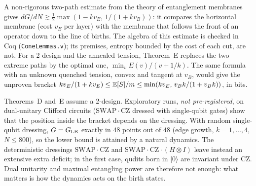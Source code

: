 \begin{remark}\label{rem:membrane}
A non-rigorous two-path estimate from the theory of entanglement membranes \cite{JHN2018,ZhouNahum2020} gives $dG/dN\gtrsim\frac12\max(1-kv_E,\,1/(1+kv_B))$: it compares the horizontal membrane (cost $v_E$ per layer) with the membrane that follows the front of an operator down to the line of births. The algebra of this estimate is checked in Coq (\texttt{ConeLemmas.v}); its premises, entropy bounded by the cost of each cut, are not. For a 2-design and the annealed tension, Theorem~E replaces the two extreme paths by the optimal one, $\min_vE(v)/(v+1/k)$. The same formula with an unknown quenched tension, convex and tangent at $v_B$, would give the unproven bracket $kv_E/(1+kv_E)\le\mathbb{E}[S]/m\le\min(kv_E,\,v_Bk/(1+v_Bk))$, in bits.
\end{remark}

\begin{remark}\label{rem:dualunit}
Theorems~D and~E assume a 2-design. Exploratory runs, \emph{not pre-registered}, on dual-unitary Clifford circuits ($\mathrm{SWAP}\cdot\mathrm{CZ}$ dressed with single-qubit gates) show that the position inside the bracket depends on the dressing. With random single-qubit dressing, $G=G_{\rm LB}$ exactly in $48$ points out of $48$ (edge growth, $k=1,\dots,4$, $N\le800$), so the lower bound is attained by a natural dynamics. The deterministic dressings $\mathrm{SWAP}\cdot\mathrm{CZ}$ and $\mathrm{SWAP}\cdot\mathrm{CZ}\cdot(H\otimes I)$ leave instead an extensive extra deficit; in the first case, qudits born in $|0\rangle$ are invariant under $\mathrm{CZ}$. Dual unitarity and maximal entangling power are therefore not enough: what matters is how the dynamics acts on the birth states.
\end{remark}
